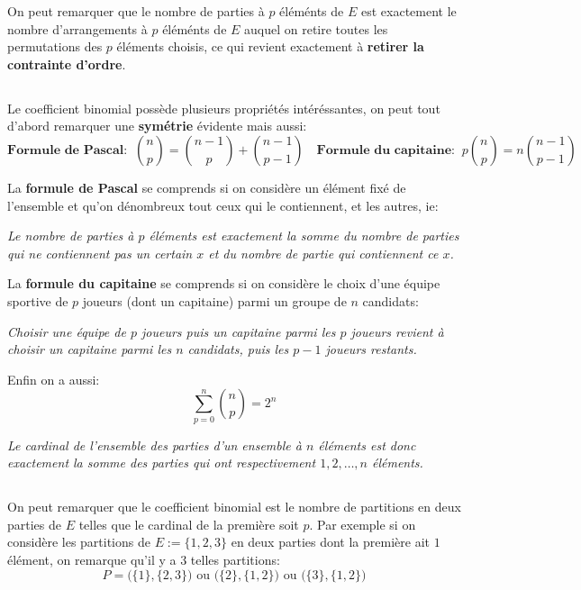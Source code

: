 On peut remarquer que le nombre de parties à \(p\) éléménts de \(E\) est exactement le nombre d'arrangements à \(p\) éléménts de \(E\) auquel on retire toutes les permutations des \(p\) éléments choisis, ce qui revient exactement à \textbf{retirer la contrainte d'ordre}.
\pagebreak
\subsection*{}
Le coefficient binomial possède plusieurs propriétés intéréssantes, on peut tout d'abord remarquer une \textbf{symétrie} évidente mais aussi:
\[
   \textbf{Formule de Pascal:} \;\; \binom{n}{p} = \binom{n - 1}{p} + \binom{n - 1}{p - 1}\quad      
   \textbf{Formule du capitaine:} \;\; p\binom{n}{p} = n\binom{n - 1}{p - 1} \;\;
\]

La \textbf{formule de Pascal} se comprends si on considère un élément fixé de l'ensemble et qu'on dénombreux tout ceux qui le contiennent, et les autres, ie: 
\begin{center}
   \textit{Le nombre de parties à \(p\) éléments est exactement la somme du nombre de parties qui ne contiennent pas un certain \(x\) et du nombre de partie qui contiennent ce \(x\).}
\end{center} 

La \textbf{formule du capitaine} se comprends si on considère le choix d'une équipe sportive de \(p\) joueurs (dont un capitaine) parmi un groupe de \(n\) candidats:
\begin{center}
   \textit{Choisir une équipe de \(p\) joueurs puis un capitaine parmi les \(p\) joueurs\+ revient à choisir un capitaine parmi les \(n\) candidats, puis les \(p - 1\) joueurs restants.}
\end{center} 
Enfin on a aussi:
\[
   \sum_{p=0}^n \binom{n}{p} = 2^n       
\]
\begin{center}
   \textit{Le cardinal de l'ensemble des parties d'un ensemble à \(n\) éléments est donc exactement la somme des parties qui ont respectivement \(1, 2, \ldots, n\) éléments.}
\end{center} 

\subsection*{}
On peut remarquer que le coefficient binomial est le nombre de partitions en deux parties de \(E\) telles que le cardinal de la première soit \(p\). Par exemple si on considère les partitions de \(E := \bigl\{1, 2, 3\bigl\}\) en deux parties dont la première ait \(1\) élément, on remarque qu'il y a 3 telles partitions:
\[
   P = \bigl(\{1\}, \{2, 3\}\bigl) \text{ ou } \bigl(\{2\}, \{1, 2\}\bigl) \text{ ou } \bigl(\{3\}, \{1, 2\}\bigl)
\]

